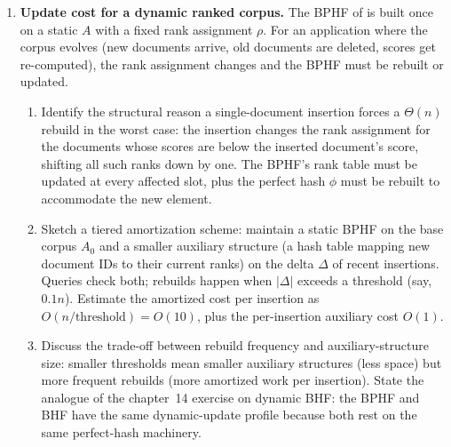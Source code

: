 \begin{enumerate}
\item \exstarstar
\label{ex:ch15-8}
\textbf{Update cost for a dynamic ranked corpus.}
The BPHF of  is built once on a static $A$ with a
fixed rank assignment $\rho$. For an application where the corpus
evolves (new documents arrive, old documents are deleted, scores
get re-computed), the rank assignment changes and the BPHF must be
rebuilt or updated.
\begin{enumerate}
  \item[(a)] Identify the structural reason a single-document
    insertion forces a $\Theta(n)$ rebuild in the worst case: the
    insertion changes the rank assignment for the documents whose
    scores are below the inserted document's score, shifting all
    such ranks down by one. The BPHF's rank table must be updated
    at every affected slot, plus the perfect hash $\phi$ must be
    rebuilt to accommodate the new element.
  \item[(b)] Sketch a tiered amortization scheme: maintain a static
    BPHF on the base corpus $A_0$ and a smaller auxiliary structure
    (a hash table mapping new document IDs to their current ranks)
    on the delta $\Delta$ of recent insertions. Queries check both;
    rebuilds happen when $|\Delta|$ exceeds a threshold (say, $0.1
    n$). Estimate the amortized cost per insertion as $O(n /
    \text{threshold}) = O(10)$, plus the per-insertion auxiliary
    cost $O(1)$.
  \item[(c)] Discuss the trade-off between rebuild frequency and
    auxiliary-structure size: smaller thresholds mean smaller
    auxiliary structures (less space) but more frequent rebuilds
    (more amortized work per insertion). State the analogue of the
    chapter~14 exercise on dynamic BHF: the BPHF and BHF have the
    same dynamic-update profile because both rest on the same
    perfect-hash machinery.
\end{enumerate}



\end{enumerate}
